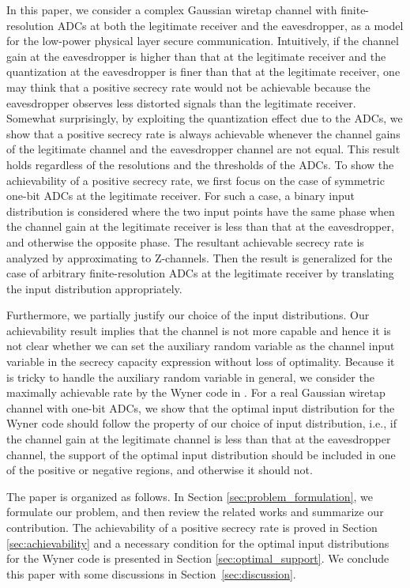 \documentclass[journal]{IEEEtran}
\begin{document}
In this paper, we consider a complex Gaussian wiretap channel with finite-resolution ADCs at both the legitimate receiver and the eavesdropper, as a model for the low-power physical layer secure communication.
Intuitively, if the channel gain at the eavesdropper is higher than that at the legitimate receiver and the quantization at the eavesdropper is finer than that at the legitimate receiver, one may think that a positive secrecy rate would not be achievable because the eavesdropper observes less distorted signals than the legitimate receiver. Somewhat surprisingly, by exploiting the quantization effect due to the ADCs, we show that a positive secrecy rate is always achievable whenever the channel gains of the legitimate channel and the eavesdropper channel are not equal. This result holds regardless of the resolutions and the thresholds of the ADCs.
To show the achievability of a positive secrecy rate, we first focus on the case of symmetric one-bit ADCs at the legitimate receiver. For such a case,  a binary input distribution is considered where the two input points have the same phase when the channel gain at the legitimate receiver is less than that at the eavesdropper, and otherwise the opposite phase. The resultant achievable secrecy rate is analyzed by approximating to  Z-channels. Then the result is generalized for the case of arbitrary finite-resolution ADCs at the legitimate receiver by translating the input distribution appropriately. 

Furthermore, we partially justify our choice of the input distributions. Our achievability result implies that the channel is not more capable and hence it is not clear whether we can set the auxiliary random variable as the channel input variable in the secrecy capacity expression without loss of optimality. Because it is tricky to handle the auxiliary random variable in general, we consider the maximally achievable rate by the Wyner code in \cite{wyner}. For a real Gaussian wiretap channel with one-bit ADCs, we show that the optimal input distribution for the Wyner code should follow the property of our choice of input distribution, i.e., if the channel gain at the legitimate channel is less than that at the eavesdropper channel, the support of the optimal input distribution should be included in one of the positive or negative regions, and otherwise it should not. 


The paper is organized as follows. In Section \ref{sec:problem_formulation}, we formulate our problem, and then review the related works and summarize our contribution. The achievability of a positive secrecy rate is proved in Section \ref{sec:achievability} and a necessary condition for the optimal input distributions for the Wyner code is presented in Section \ref{sec:optimal_support}. We conclude this paper with some discussions in \mbox{Section \ref{sec:discussion}}.
\end{document}
